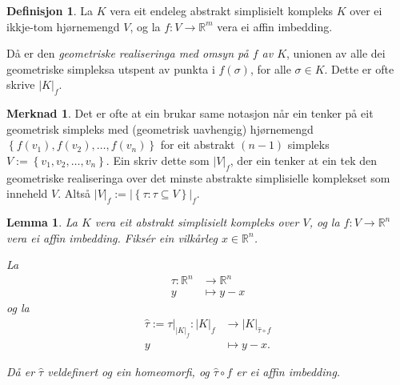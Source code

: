 \documentclass[a4paper, 12pt, norsk]{article}
\theoremstyle{plain}
\newtheorem{lemma}[theorem]{Lemma}
\theoremstyle{definition}
\newtheorem{definition}[theorem]{Definisjon}
\newtheorem{remark}[theorem]{Merknad}
\newcommand{\Rb}{\mathbb{R}}
\newcommand{\gr}[1]{ \lvert #1 \rvert } %
\newcommand{\set}[1]{ \left\{ #1 \right\} } %
\begin{document}
\begin{definition} \label{def:gr}
	La \( K \) vera eit endeleg abstrakt simplisielt kompleks $K$ over ei ikkje-tom hjørnemengd $V$, og la $f:V\to\Rb^m$ vera ei affin imbedding.
	
	Då er den \emph{geometriske realiseringa med omsyn på $f$ av \( K \)}, unionen av alle dei geometriske simpleksa utspent av punkta i $f(\sigma)$, for alle $\sigma\in K$. Dette er ofte skrive $\gr{K}_f$.
\end{definition}

\begin{remark} \label{rem:gr-SK}
	Det er ofte at ein brukar same notasjon når ein tenker på eit geometrisk simpleks med (geometrisk uavhengig) hjørnemengd \( \set{f(v_1), f(v_2), \dots, f(v_n)} \) for eit abstrakt \( (n-1) \) simpleks \( V := \set{v_1, v_2, \dots, v_n} \). Ein skriv dette som \( \gr{V}_f \), der ein tenker at ein tek den geometriske realiseringa over det minste abstrakte simplisielle komplekset som inneheld \( V \). Altså \( \gr{V}_f := \gr{\set{\tau : \tau \subseteq V}}_f \).
\end{remark}

\begin{lemma} \label{thm:tau-homeomorfi}
	La \( K \) vera eit abstrakt simplisielt kompleks over \( V \), og la \( f: V \to \Rb^n \) vera ei affin imbedding. Fiksér ein vilkårleg \( x \in \Rb^n \).
	
	La
	\begin{align*}
		\tau: \Rb^n &\to \Rb^n \\
		y &\mapsto y - x
	\end{align*}
	og la
	\begin{align*}
		\hat{\tau} := \tau|_{\gr{K}_f}: \gr{K}_f &\to \gr{K}_{\hat{\tau} \circ f} \\
		y  &\mapsto y - x.
	\end{align*}

	Då er \( \hat{\tau} \) veldefinert og ein homeomorfi, og \( \hat{\tau} \circ f \) er ei affin imbedding.
\end{lemma}
\end{document}
